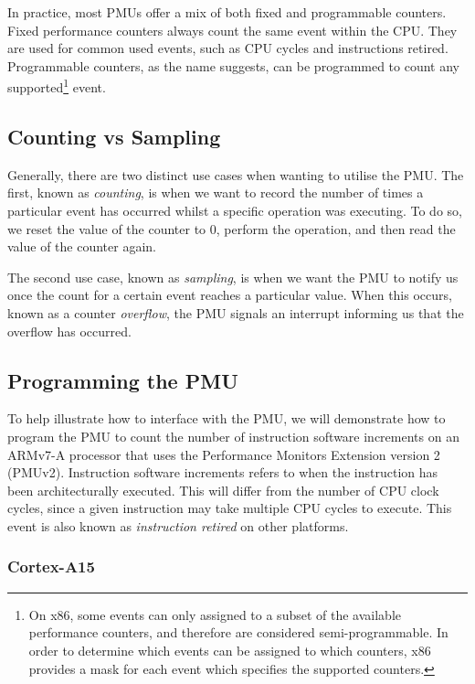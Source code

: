 {In practice, most PMUs offer a mix of both fixed and programmable counters. Fixed performance counters always count the same event within the CPU. They are used for common used events, such as CPU cycles and instructions retired. Programmable counters, as the name suggests, can be programmed to count any supported\footnote{On x86, some events can only assigned to a subset of the available performance counters, and therefore are considered semi-programmable. In order to determine which events can be assigned to which counters, x86 provides a mask for each event which specifies the supported counters.} event.

\subsection{Counting vs Sampling}\label{sect:sampling_counting}

Generally, there are two distinct use cases when wanting to utilise the PMU. The first, known as \textit{counting}, is when we want to record the number of times a particular event has occurred whilst a specific operation was executing. To do so, we reset the value of the counter to 0, perform the operation, and then read the value of the counter again. 

The second use case, known as \textit{sampling}, is when we want the PMU to notify us once the count for a certain event reaches a particular value. When this occurs, known as a counter \textit{overflow}, the PMU signals an interrupt informing us that the overflow has occurred. 

\subsection{Programming the PMU}\label{sect:programming_pmu}

To help illustrate how to interface with the PMU, we will demonstrate how to program the PMU to count the number of instruction software increments on an ARMv7-A processor that uses the Performance Monitors Extension version 2 (PMUv2). Instruction software increments refers to when the instruction has been architecturally executed. This will differ from the number of CPU clock cycles, since a given instruction may take multiple CPU cycles to execute. This event is also known as \textit{instruction retired} on other platforms.

\subsubsection{Cortex-A15}

}
